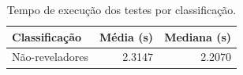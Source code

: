\begin{table}[ht]
\centering
\caption{Tempo de execução dos testes por classificação.}
\label{tab:execution-time-classification}
\begin{tabular}{lrr}
\hline
Classificação & Média (s) & Mediana (s) \\
\hline
Não-reveladores & 2.3147 & 2.2070 \\
\hline
\end{tabular}
\end{table}
